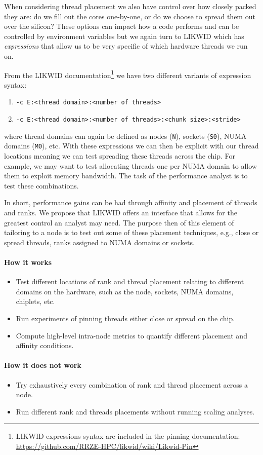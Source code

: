 When considering thread placement we also have control over how closely packed
they are: do we fill out the cores one-by-one, or do we choose to spread them
out over the silicon? These options can impact how a code performs and can be
controlled by environment variables but we again turn to LIKWID which has
\emph{expressions} that allow us to be very specific of which hardware threads
we run on.

From the LIKWID documentation\footnote{LIKWID expressions syntax are included in the pinning documentation: \url{https://github.com/RRZE-HPC/likwid/wiki/Likwid-Pin}} we have two
different variants of expression syntax:
\begin{enumerate}
  \item \texttt{-c E:<thread domain>:<number of threads>}
  \item \texttt{-c E:<thread domain>:<number of threads>:<chunk size>:<stride>}
\end{enumerate}
where thread domains can again be defined as nodes (\texttt{N}), sockets
(\texttt{S0}), NUMA domains (\texttt{M0}), etc. With these expressions we can
then be explicit with our thread locations meaning we can test spreading these
threads across the chip. For example, we may want to test allocating threads
one per NUMA domain to allow them to exploit memory bandwidth. The task of the
performance analyst is to test these combinations.

In short, performance gains can be had through affinity and placement of
threads and ranks. We propose that LIKWID offers an interface that allows for
the greatest control an analyst may need. The purpose then of this element of
tailoring to a node is to test out some of these placement techniques, e.g.,
close or spread threads, ranks assigned to NUMA domains or sockets.

\paragraph*{How it works}

\begin{itemize}[noitemsep]
  \item[$\boxplus$] Test different locations of rank and thread placement relating to different domains on the hardware, such as the node, sockets, NUMA domains, chiplets, etc.
  \item[$\boxplus$] Run experiments of pinning threads either close or spread on the chip.
  \item[$\boxplus$] Compute high-level intra-node metrics to quantify different placement and affinity conditions.
\end{itemize}

\paragraph*{How it does not work}

\begin{itemize}[noitemsep]
  \item[$\boxminus$] Try exhaustively every combination of rank and thread placement across a node.
  \item[$\boxminus$] Run different rank and threads placements without running scaling analyses.
\end{itemize}
